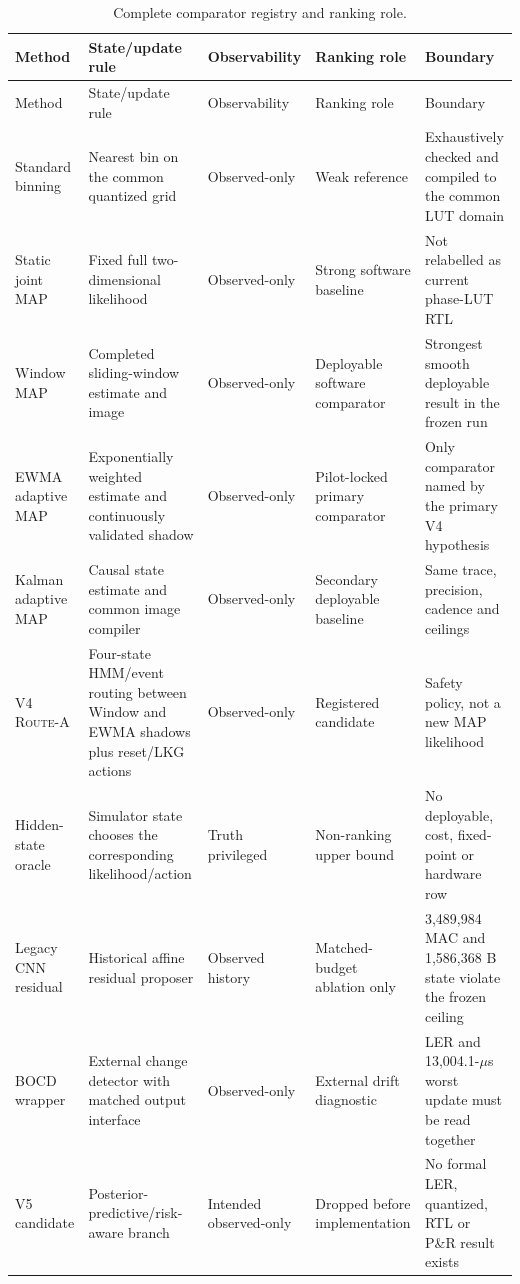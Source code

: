 \documentclass[11pt]{article}
\newcommand{\RouteA}{\textsc{Route-A}}
\begin{document}
{\small
\begin{longtable}{@{}L{0.20\textwidth} L{0.21\textwidth} L{0.16\textwidth} L{0.16\textwidth} L{0.17\textwidth}@{}}
\caption{Complete comparator registry and ranking role.}
\label{tab:supp-comparator-registry}\\
\toprule
Method & State/update rule & Observability & Ranking role & Boundary \\
\midrule
\endfirsthead
\toprule
Method & State/update rule & Observability & Ranking role & Boundary \\
\midrule
\endhead
Standard binning & Nearest bin on the common quantized grid & Observed-only & Weak reference & Exhaustively checked and compiled to the common LUT domain \\
Static joint MAP & Fixed full two-dimensional likelihood & Observed-only & Strong software baseline & Not relabelled as current phase-LUT RTL \\
Window MAP & Completed sliding-window estimate and image & Observed-only & Deployable software comparator & Strongest smooth deployable result in the frozen run \\
EWMA adaptive MAP & Exponentially weighted estimate and continuously validated shadow & Observed-only & Pilot-locked primary comparator & Only comparator named by the primary V4 hypothesis \\
Kalman adaptive MAP & Causal state estimate and common image compiler & Observed-only & Secondary deployable baseline & Same trace, precision, cadence and ceilings \\
V4 \RouteA{} & Four-state HMM/event routing between Window and EWMA shadows plus reset/LKG actions & Observed-only & Registered candidate & Safety policy, not a new MAP likelihood \\
Hidden-state oracle & Simulator state chooses the corresponding likelihood/action & Truth privileged & Non-ranking upper bound & No deployable, cost, fixed-point or hardware row \\
Legacy CNN residual & Historical affine residual proposer & Observed history & Matched-budget ablation only & 3,489,984 MAC and 1,586,368 B state violate the frozen ceiling \\
BOCD wrapper & External change detector with matched output interface & Observed-only & External drift diagnostic & LER and 13,004.1-$\mu$s worst update must be read together \\
V5 candidate & Posterior-predictive/risk-aware branch & Intended observed-only & Dropped before implementation & No formal LER, quantized, RTL or P\&R result exists \\
\bottomrule
\end{longtable}
}
\end{document}
